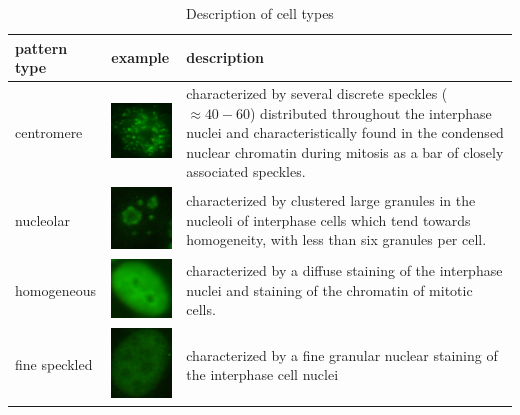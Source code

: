 \begin{table}
	\begin{center}
	\caption{Description of cell types}
	\label{tab:Desc}
	
	\begin{tabular}{|m{2.3cm}|m{2.1cm}|m{8cm}|}
		\hline
		\textbf{pattern type} & \textbf{example} & \textbf{description} \\
		\hline
		centromere & \includegraphics[width=2cm]{Figures/describing/centromere} & characterized by several 			discrete speckles ($ \approx 40-60$) distributed throughout the interphase nuclei and 		characteristically found in the condensed nuclear chromatin during mitosis as a bar of closely associated speckles. \\ \hline
		nucleolar & \vspace{5pt} \includegraphics[width=2cm]{Figures/describing/nucleolar} & characterized by clustered 			large granules in the nucleoli of interphase cells which tend towards homogeneity, with less than six granules per cell. \\ \hline
		homogeneous & \vspace{5pt} \includegraphics[width=2cm]{Figures/describing/homogeneous} & characterized by a 	diffuse staining of the interphase nuclei and staining of the chromatin of mitotic cells. \\ \hline
		
		fine speckled & \vspace{5pt} \includegraphics[width=2cm]{Figures/describing/fine_speckled} & characterized by a 			fine granular nuclear staining of the interphase cell nuclei \\ \hline
		

\end{tabular}
\end{center}
\end{table}
